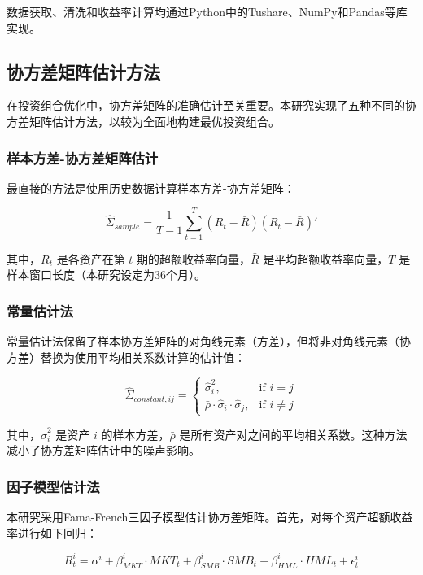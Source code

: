 \documentclass[12pt, a4paper]{article}
\begin{document}
数据获取、清洗和收益率计算均通过Python中的Tushare、NumPy和Pandas等库实现。

\subsection{协方差矩阵估计方法}
在投资组合优化中，协方差矩阵的准确估计至关重要。本研究实现了五种不同的协方差矩阵估计方法，以较为全面地构建最优投资组合。

\subsubsection{样本方差-协方差矩阵估计}
最直接的方法是使用历史数据计算样本方差-协方差矩阵：

\begin{equation}
\hat{\Sigma}_{sample} = \frac{1}{T-1} \sum_{t=1}^{T} (R_t - \bar{R})(R_t - \bar{R})'
\end{equation}

其中，$R_t$ 是各资产在第 $t$ 期的超额收益率向量，$\bar{R}$ 是平均超额收益率向量，$T$ 是样本窗口长度（本研究设定为36个月）。

\subsubsection{常量估计法}
常量估计法保留了样本协方差矩阵的对角线元素（方差），但将非对角线元素（协方差）替换为使用平均相关系数计算的估计值：

\begin{equation}
\hat{\Sigma}_{constant,ij} = 
\begin{cases}
\hat{\sigma}_i^2, & \text{if } i = j \\
\bar{\rho} \cdot \hat{\sigma}_i \cdot \hat{\sigma}_j, & \text{if } i \neq j
\end{cases}
\end{equation}

其中，$\hat{\sigma}_i^2$ 是资产 $i$ 的样本方差，$\bar{\rho}$ 是所有资产对之间的平均相关系数。这种方法减小了协方差矩阵估计中的噪声影响。

\subsubsection{因子模型估计法}
本研究采用Fama-French三因子模型估计协方差矩阵。首先，对每个资产超额收益率进行如下回归：

\begin{equation}
R_t^i = \alpha^i + \beta_{MKT}^i \cdot MKT_t + \beta_{SMB}^i \cdot SMB_t + \beta_{HML}^i \cdot HML_t + \epsilon_t^i
\end{equation}
\end{document}
